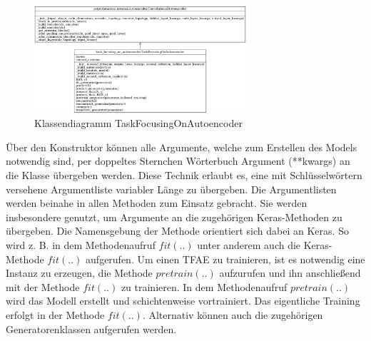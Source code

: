 	\begin{figure}[h]
		\centering
		\includegraphics[width=0.7\textwidth, center]{bilder/Klassendiagramme/TFAE.png}
		\caption[Klassendiagramm TaskFocusingOnAutoencoder]{Klassendiagramm TaskFocusingOnAutoencoder}
		\label{img:KlassendiagrammTFAE}
	\end{figure}  
	Über den Konstruktor können alle Argumente, welche zum Erstellen des Models notwendig sind, per doppeltes Sternchen Wörterbuch Argument (**kwargs) an die Klasse übergeben werden. Diese Technik erlaubt es, eine mit Schlüsselwörtern versehene Argumentliste variabler Länge zu übergeben. Die Argumentlisten werden beinahe in allen Methoden zum Einsatz gebracht. Sie werden insbesondere genutzt, um Argumente an die zugehörigen Keras-Methoden zu übergeben. Die Namensgebung der Methode orientiert sich dabei an Keras. So wird z. B. in dem Methodenaufruf $fit(..)$ unter anderem auch die Keras-Methode $fit(..)$ aufgerufen. Um einen TFAE zu trainieren, ist es notwendig eine Instanz zu erzeugen, die Methode $pretrain(..)$ aufzurufen und ihn anschließend mit der Methode $fit(..)$ zu trainieren.
	In dem Methodenaufruf $pretrain(..)$ wird das Modell erstellt und schichtenweise vortrainiert. Das eigentliche Training erfolgt in der Methode $fit(..)$. Alternativ können auch die zugehörigen Generatorenklassen aufgerufen werden.    

